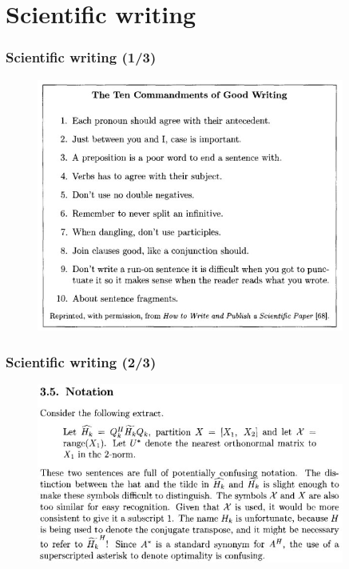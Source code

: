 \documentclass{beamer}
\begin{document}
\section{Scientific writing}
\begin{frame}
\frametitle{Scientific writing (1/3)}
\begin{figure}[t]
 \includegraphics[width=0.9\textwidth]{images/ten.jpeg}
\end{figure}
\end{frame}
\begin{frame}
\frametitle{Scientific writing (2/3)}
\begin{figure}[t]
 \includegraphics[width=0.9\textwidth]{images/notation.jpeg}
\end{figure}
\end{frame}
\end{document}
